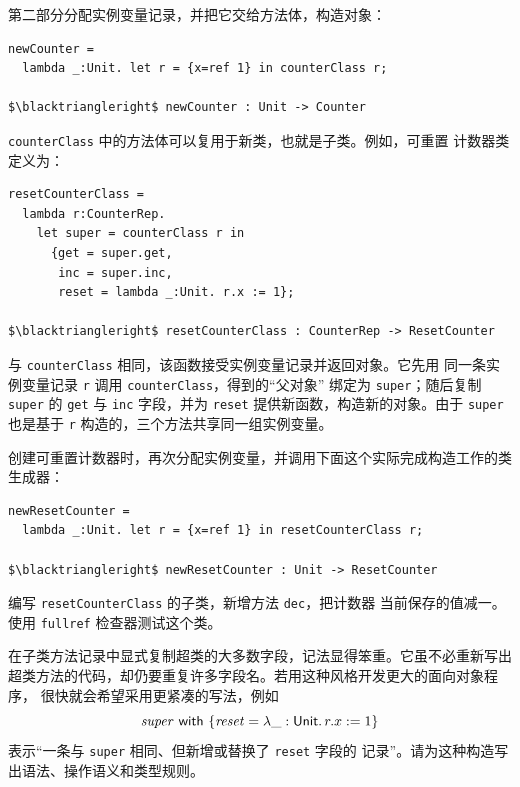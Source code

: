 第二部分分配实例变量记录，并把它交给方法体，构造对象：

\begin{lstlisting}[mathescape=true]
newCounter =
  lambda _:Unit. let r = {x=ref 1} in counterClass r;

$\blacktriangleright$ newCounter : Unit -> Counter
\end{lstlisting}

\texttt{counterClass} 中的方法体可以复用于新类，也就是子类。例如，可重置
计数器类定义为：

\begin{lstlisting}[mathescape=true]
resetCounterClass =
  lambda r:CounterRep.
    let super = counterClass r in
      {get = super.get,
       inc = super.inc,
       reset = lambda _:Unit. r.x := 1};

$\blacktriangleright$ resetCounterClass : CounterRep -> ResetCounter
\end{lstlisting}

与 \texttt{counterClass} 相同，该函数接受实例变量记录并返回对象。它先用
同一条实例变量记录 \texttt{r} 调用 \texttt{counterClass}，得到的“父对象”
绑定为 \texttt{super}；随后复制 \texttt{super} 的 \texttt{get} 与
\texttt{inc} 字段，并为 \texttt{reset} 提供新函数，构造新的对象。由于
\texttt{super} 也是基于 \texttt{r} 构造的，三个方法共享同一组实例变量。

创建可重置计数器时，再次分配实例变量，并调用下面这个实际完成构造工作的类
生成器：

\begin{lstlisting}[mathescape=true]
newResetCounter =
  lambda _:Unit. let r = {x=ref 1} in resetCounterClass r;

$\blacktriangleright$ newResetCounter : Unit -> ResetCounter
\end{lstlisting}

\begin{exercise}
\label{ex:18.6.1}
编写 \texttt{resetCounterClass} 的子类，新增方法 \texttt{dec}，把计数器
当前保存的值减一。使用 \texttt{fullref} 检查器测试这个类。
\end{exercise}

\begin{exercise}[\(\star\star\), \(\nrightarrow\)]
\label{ex:18.6.2}
在子类方法记录中显式复制超类的大多数字段，记法显得笨重。它虽不必重新写出
超类方法的代码，却仍要重复许多字段名。若用这种风格开发更大的面向对象程序，
很快就会希望采用更紧凑的写法，例如
\[
  \mathit{super}\ \mathsf{with}\
  \{\mathit{reset}=\lambda\_:\mathsf{Unit}.\,r.x:=1\}
\]
表示“一条与 \texttt{super} 相同、但新增或替换了 \texttt{reset} 字段的
记录”。请为这种构造写出语法、操作语义和类型规则。
\end{exercise}

